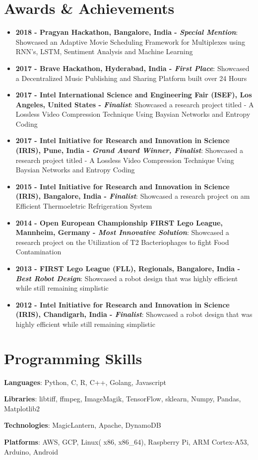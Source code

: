 \documentclass[letterpaper,11pt]{article}
\newcommand{\resumeItem}[2]{
  \item\small{
    \textbf{#1}{: #2 \vspace{-2pt}}
  }
}
\newcommand{\resumeSubItem}[2]{\resumeItem{#1}{#2}\vspace{-4pt}}
\newcommand{\resumeSubHeadingListStart}{\begin{itemize}[leftmargin=*]}
\newcommand{\resumeSubHeadingListEnd}{\end{itemize}}
\begin{document}
\section{Awards \& Achievements}
  \resumeSubHeadingListStart
    \resumeSubItem{2018 - Pragyan Hackathon, Bangalore, India - \textit{Special Mention}}
		{Showcased an Adaptive Movie Scheduling Framework for Multiplexes using RNN's, LSTM, Sentiment Analysis and Machine Learning}
    \resumeSubItem{2017 - Brave Hackathon, Hyderabad, India - \textit{First Place}}
		{Showcased a Decentralized Music Publishing and Sharing Platform built over 24 Hours}
    \resumeSubItem{2017 - Intel International Science and Engineering Fair (ISEF), Los Angeles, United States - \textit{Finalist}}
		{Showcased a research project titled - A Lossless Video Compression Technique Using Baysian Networks and Entropy Coding}
    \resumeSubItem{2017 - Intel Initiative for Research and Innovation in Science (IRIS), Pune, India - \textit{Grand Award Winner, Finalist}}
		{Showcased a research project titled - A Lossless Video Compression Technique Using Baysian Networks and Entropy Coding}
    \resumeSubItem{2015 - Intel Initiative for Research and Innovation in Science (IRIS), Bangalore, India - \textit{Finalist}}
		{Showcased a research project on am Efficient Thermoeletric Refrigeration System}
    \resumeSubItem{2014 - Open European Championship FIRST Lego League, Mannheim, Germany - \textit{Most Innovative Solution}}
		{Showcased a research project on the Utilization of T2 Bacteriophages to fight Food Contamination}
    \resumeSubItem{2013 - FIRST Lego League (FLL), Regionals, Bangalore, India - \textit{Best Robot Design}}
		{Showcased a robot design that was highly efficient while still remaining simplistic}
    \resumeSubItem{2012 - Intel Initiative for Research and Innovation in Science (IRIS), Chandigarh, India - \textit{Finalist}}
		{Showcased a robot design that was highly efficient while still remaining simplistic}
  \resumeSubHeadingListEnd


\section{Programming Skills}
  \resumeSubHeadingListStart
    \item{\textbf{Languages}{: Python, C, R, C++, Golang, Javascript}
    \item{\textbf{Libraries}{: libtiff, ffmpeg, ImageMagik, TensorFlow, sklearn, Numpy, Pandas, Matplotlib2}}
	\item{\textbf{Technologies}{: MagicLantern, Apache, DynamoDB}}		%
	\item{\textbf{Platforms}{: AWS, GCP, Linux( x86, x86\_64), Raspberry Pi, ARM Cortex-A53, Arduino, Android}}}
  \resumeSubHeadingListEnd


\end{document}
